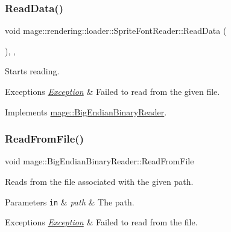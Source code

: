 \subsubsection{\texorpdfstring{Read\+Data()}{ReadData()}}
{\footnotesize\ttfamily void mage\+::rendering\+::loader\+::\+Sprite\+Font\+Reader\+::\+Read\+Data (\begin{DoxyParamCaption}{ }\end{DoxyParamCaption})\hspace{0.3cm}{\ttfamily [override]}, {\ttfamily [private]}, {\ttfamily [virtual]}}

Starts reading.


\begin{DoxyExceptions}{Exceptions}
{\em \mbox{\hyperlink{classmage_1_1_exception}{Exception}}} & Failed to read from the given file. \\
\hline
\end{DoxyExceptions}


Implements \mbox{\hyperlink{classmage_1_1_big_endian_binary_reader_a7dc0689d598fa91308597b129516a11d}{mage\+::\+Big\+Endian\+Binary\+Reader}}.

\mbox{\label{classmage_1_1rendering_1_1loader_1_1_sprite_font_reader_a0308b90e3cf888d383a228cfe8827972}} 
\subsubsection{\texorpdfstring{Read\+From\+File()}{ReadFromFile()}}
{\footnotesize\ttfamily void mage\+::\+Big\+Endian\+Binary\+Reader\+::\+Read\+From\+File}

Reads from the file associated with the given path.


\begin{DoxyParams}[1]{Parameters}
\mbox{\tt in}  & {\em path} & The path. \\
\hline
\end{DoxyParams}

\begin{DoxyExceptions}{Exceptions}
{\em \mbox{\hyperlink{classmage_1_1_exception}{Exception}}} & Failed to read from the file. \\
\hline
\end{DoxyExceptions}
\mbox{\label{classmage_1_1rendering_1_1loader_1_1_sprite_font_reader_afc48490dca5042078726a1ec3fe7abe7}} 
